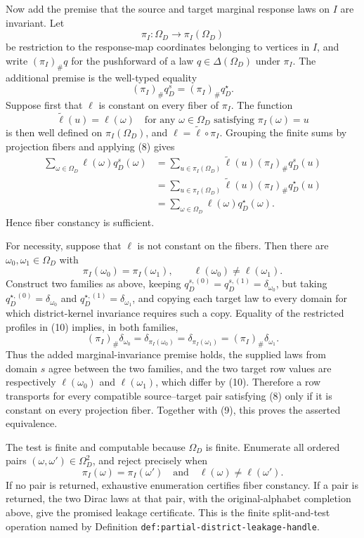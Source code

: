 Now add the premise that the source and target marginal response laws on \(I\) are invariant.  Let
\[
\pi_I:\Omega_D\longrightarrow\pi_I(\Omega_D)
\]
be restriction to the response-map coordinates belonging to vertices in \(I\), and write \((\pi_I)_{\#}q\) for the pushforward of a law \(q\in\Delta(\Omega_D)\) under \(\pi_I\).  The additional premise is the well-typed equality
\[
(\pi_I)_{\#}q_D^s=(\pi_I)_{\#}q_D^\star.
\tag{8}
\]
Suppose first that \(\ell\) is constant on every fiber of \(\pi_I\).  The function
\[
\widetilde\ell(u)=\ell(\omega)
\quad\text{for any }\omega\in\Omega_D\text{ satisfying }\pi_I(\omega)=u
\]
is then well defined on \(\pi_I(\Omega_D)\), and \(\ell=\widetilde\ell\circ\pi_I\).  Grouping the finite sums by projection fibers and applying (8) gives
\[
\begin{aligned}
\sum_{\omega\in\Omega_D}\ell(\omega)q_D^s(\omega)
&=\sum_{u\in\pi_I(\Omega_D)}
  \widetilde\ell(u)(\pi_I)_{\#}q_D^s(u)\\
&=\sum_{u\in\pi_I(\Omega_D)}
  \widetilde\ell(u)(\pi_I)_{\#}q_D^\star(u)\\
&=\sum_{\omega\in\Omega_D}\ell(\omega)q_D^\star(\omega).
\end{aligned}
\tag{9}
\]
Hence fiber constancy is sufficient.

For necessity, suppose that \(\ell\) is not constant on the fibers.  Then there are \(\omega_0,\omega_1\in\Omega_D\) with
\[
\pi_I(\omega_0)=\pi_I(\omega_1),
\qquad
\ell(\omega_0)\ne\ell(\omega_1).
\tag{10}
\]
Construct two families as above, keeping \(q_D^{s,(0)}=q_D^{s,(1)}=\delta_{\omega_0}\), but taking \(q_D^{\star,(0)}=\delta_{\omega_0}\) and \(q_D^{\star,(1)}=\delta_{\omega_1}\), and copying each target law to every domain for which district-kernel invariance requires such a copy.  Equality of the restricted profiles in (10) implies, in both families,
\[
(\pi_I)_{\#}\delta_{\omega_0}
=\delta_{\pi_I(\omega_0)}
=\delta_{\pi_I(\omega_1)}
=(\pi_I)_{\#}\delta_{\omega_1}.
\tag{11}
\]
Thus the added marginal-invariance premise holds, the supplied laws from domain \(s\) agree between the two families, and the two target row values are respectively \(\ell(\omega_0)\) and \(\ell(\omega_1)\), which differ by (10).  Therefore a row transports for every compatible source--target pair satisfying (8) only if it is constant on every projection fiber.  Together with (9), this proves the asserted equivalence.

The test is finite and computable because \(\Omega_D\) is finite.  Enumerate all ordered pairs \((\omega,\omega')\in\Omega_D^2\), and reject precisely when
\[
\pi_I(\omega)=\pi_I(\omega')
\quad\text{and}\quad
\ell(\omega)\ne\ell(\omega').
\tag{12}
\]
If no pair is returned, exhaustive enumeration certifies fiber constancy.  If a pair is returned, the two Dirac laws at that pair, with the original-alphabet completion above, give the promised leakage certificate.  This is the finite split-and-test operation named by Definition \texttt{def:partial-district-leakage-handle}.

